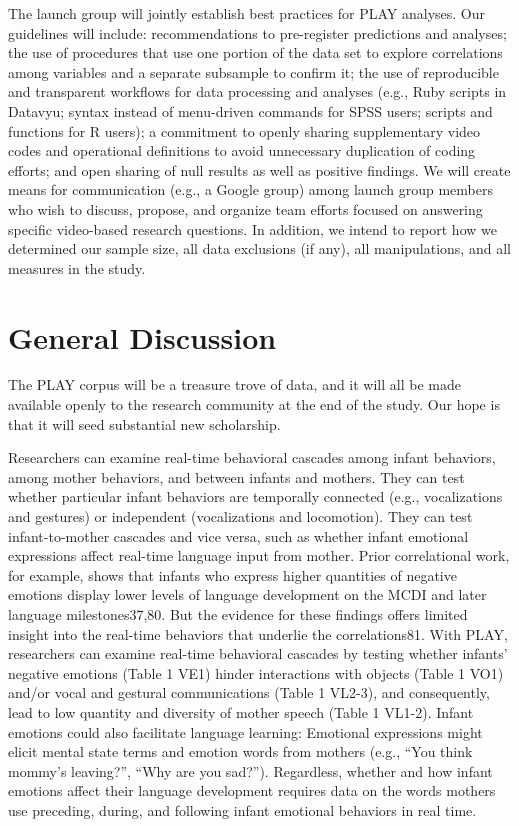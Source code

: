 \documentclass[english,man]{apa6}
\theoremstyle{definition}
\theoremstyle{definition}
\theoremstyle{definition}
\theoremstyle{remark}
\begin{document}
The launch group will jointly establish best practices for PLAY
analyses. Our guidelines will include: recommendations to pre-register
predictions and analyses; the use of procedures that use one portion of
the data set to explore correlations among variables and a separate
subsample to confirm it; the use of reproducible and transparent
workflows for data processing and analyses (e.g., Ruby scripts in
Datavyu; syntax instead of menu-driven commands for SPSS users; scripts
and functions for R users); a commitment to openly sharing supplementary
video codes and operational definitions to avoid unnecessary duplication
of coding efforts; and open sharing of null results as well as positive
findings. We will create means for communication (e.g., a Google group)
among launch group members who wish to discuss, propose, and organize
team efforts focused on answering specific video-based research
questions. In addition, we intend to report how we determined our sample
size, all data exclusions (if any), all manipulations, and all measures
in the study.

\section{General Discussion}\label{general-discussion}

The PLAY corpus will be a treasure trove of data, and it will all be
made available openly to the research community at the end of the study.
Our hope is that it will seed substantial new scholarship.

Researchers can examine real-time behavioral cascades among infant
behaviors, among mother behaviors, and between infants and mothers. They
can test whether particular infant behaviors are temporally connected
(e.g., vocalizations and gestures) or independent (vocalizations and
locomotion). They can test infant-to-mother cascades and vice versa,
such as whether infant emotional expressions affect real-time language
input from mother. Prior correlational work, for example, shows that
infants who express higher quantities of negative emotions display lower
levels of language development on the MCDI and later language
milestones37,80. But the evidence for these findings offers limited
insight into the real-time behaviors that underlie the correlations81.
With PLAY, researchers can examine real-time behavioral cascades by
testing whether infants' negative emotions (Table 1 VE1) hinder
interactions with objects (Table 1 VO1) and/or vocal and gestural
communications (Table 1 VL2-3), and consequently, lead to low quantity
and diversity of mother speech (Table 1 VL1-2). Infant emotions could
also facilitate language learning: Emotional expressions might elicit
mental state terms and emotion words from mothers (e.g., \enquote{You
think mommy's leaving?}, \enquote{Why are you sad?}). Regardless,
whether and how infant emotions affect their language development
requires data on the words mothers use preceding, during, and following
infant emotional behaviors in real time.
\end{document}
